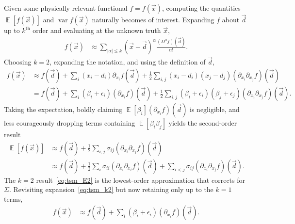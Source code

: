 \documentclass[letterpaper,11pt,nointlimits,reqno,draft]{amsbook}
\newcommand{\expect}[1]{\operatorname{\mathbb{E}}\left[#1\right]}
\begin{document}
Given some physically relevant functional $f = f\left(\vec{x}\right)$,
computing the quantities $\expect{f\left(\vec{x}\right)}$ and
$\operatorname{var} f\left(\vec{x}\right) $ naturally becomes of interest.
Expanding $f$ about $\vec{d}$ up to $k^\mathrm{th}$ order and evaluating at the
unknown truth $\vec{x}$,
\begin{align}
  f(\vec{x})
&\approx
  \sum_{|\alpha| \le k} \left( \vec{x} - \vec{d} \right)^\alpha
  \frac{\left(D^\alpha f\right)\left(\vec{d}\right)}{\alpha!}
.
\end{align}
Choosing $k=2$, expanding the notation, and using the definition of $\vec{d}$,
\begin{align}
  f\left(\vec{x}\right)
&\approx
    f\left(\vec{d}\right)
  + \sum_i \left(x_i-d_i\right) \partial_{x_i} f\left(\vec{d}\right)
  + \frac{1}{2} \sum_{i,j}
                \left(x_i-d_i\right)\left(x_j-d_j\right)
                \left(\partial_{x_i} \partial_{x_j} f\right)\left(\vec{d}\right)
\\
&=
    f\left(\vec{d}\right)
  + \sum_i \left(\beta_i+\epsilon_i\right)
           \left(\partial_{x_i} f\right)\left(\vec{d}\right)
  + \frac{1}{2} \sum_{i,j}
                \left(\beta_i+\epsilon_i\right)
                \left(\beta_j+\epsilon_j\right)
                \left(\partial_{x_i} \partial_{x_j} f\right)\left(\vec{d}\right)
\label{eq:tsm_k2}
.
\end{align}
Taking the expectation, boldly claiming $\expect{\beta_i}\left(\partial_{x_i}
f\right)\left(\vec{d}\right)$ is negligible, and less courageously dropping
terms containing $\expect{\beta_i \beta_j}$ yields the second-order result
\begin{align}
  \expect{f\left(\vec{x}\right)}
&\approx
    f\left(\vec{d}\right)
  + \frac{1}{2} \sum_{i,j}
                \sigma_{ij}
                \left(\partial_{x_i} \partial_{x_j} f\right)\left(\vec{d}\right)
\\
&\approx
    f\left(\vec{d}\right)
  + \frac{1}{2} \sum_{i}
                \sigma_{ii}
                \left(\partial_{x_i} \partial_{x_i} f\right)\left(\vec{d}\right)
  +             \sum_{i<j}
                \sigma_{ij}
                \left(\partial_{x_i} \partial_{x_j} f\right)\left(\vec{d}\right)
\label{eq:tsm_E2}
.
\end{align}
The $k=2$ result~\eqref{eq:tsm_E2} is the lowest-order approximation that
corrects for $\Sigma$.  Revisiting expansion~\eqref{eq:tsm_k2} but now
retaining only up to the $k=1$ terms,
\begin{align}
  f\left(\vec{x}\right)
&\approx
    f\left(\vec{d}\right)
  + \sum_i \left(\beta_i+\epsilon_i\right)
           \left(\partial_{x_i} f\right)\left(\vec{d}\right)
\label{eq:tsm_k1}
.
\end{align}
\end{document}

